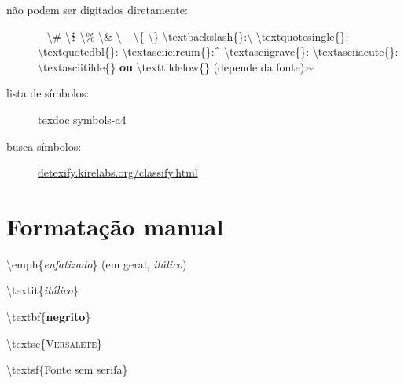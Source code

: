 \documentclass[10pt,twoside,english,brazilian]{article}
\begin{document}
\begin{multicols}{3}
\vspace{\baselineskip}

\begin{description}
  \item[não podem ser digitados diretamente:]~\vspace{5pt}\newline
    \textbackslash\#
    \quad\textbackslash\$
    \quad\textbackslash\%
    \quad\textbackslash\&
    \quad\textbackslash\_
    \quad\textbackslash\{
    \quad\textbackslash\}
    \vspace{3pt}\newline
    \textbackslash{}textbackslash\{\}:\enspace\textbackslash
    \quad\textbackslash{}textquotesingle\{\}:\enspace\textquotesingle
    \quad\textbackslash{}textquotedbl\{\}:\enspace\textquotedbl
    \vspace{3pt}\newline
    \textbackslash{}textasciicircum\{\}:\!\enspace\textasciicircum\!
    \quad\textbackslash{}textasciigrave\{\}:\!\enspace\textasciigrave\!
    \quad\textbackslash{}textasciiacute\{\}:\!\enspace\textasciiacute
    \vspace{3pt}\newline
    \textbackslash{}textasciitilde\{\} \textbf{ou}
    \textbackslash{}texttildelow\{\} (depende da fonte):\enspace\textasciitilde
\end{description}


\vspace{\baselineskip}


\begin{description}
  \item[lista de símbolos:] \textsf{texdoc symbols-a4}
  \item[busca símbolos:] \url{detexify.kirelabs.org/classify.html}
\end{description}

\section*{Formatação manual}

\textbackslash{}emph\{\emph{enfatizado}\} (em geral, \textit{itálico})

\textbackslash{}textit\{\textit{itálico}\}

\textbackslash{}textbf\{\textbf{negrito}\}

\textbackslash{}textsc\{\textsc{Versalete}\}

\textbackslash{}textsf\{\textsf{Fonte sem serifa}\}


\end{multicols}
\end{document}

